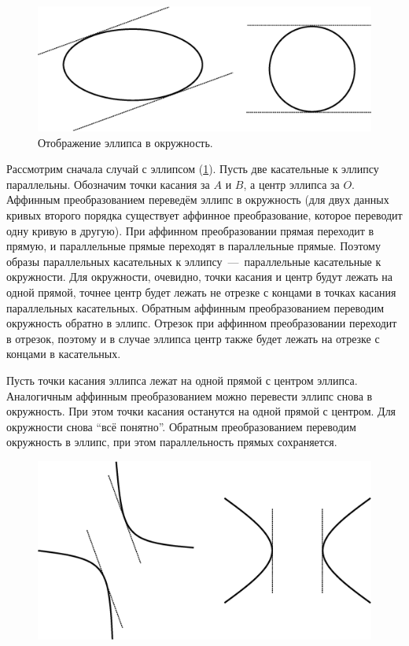 \documentclass[a4paper,12pt]{article}
\begin{document}
  \begin{solution}
    \begin{figure}
      \centering
      
      \includegraphics[width=0.5\columnwidth]{ellipse-new-ellipse}
      
      \caption{Отображение эллипса в окружность.}
      \label{fig:ellipse-new-ellipse}
    \end{figure}
    
    Рассмотрим сначала случай с эллипсом (\ref{fig:ellipse-new-ellipse}).
    Пусть две касательные к эллипсу параллельны.
    Обозначим точки касания за $A$ и $B$, а центр эллипса за $O$.
    Аффинным преобразованием переведём эллипс в окружность (для двух данных кривых второго порядка существует аффинное преобразование, которое переводит одну кривую в другую).
    При аффинном преобразовании прямая переходит в прямую, и параллельные прямые переходят в параллельные прямые.
    Поэтому образы параллельных касательных к эллипсу~---~параллельные касательные к окружности.
    Для окружности, очевидно, точки касания и центр будут лежать на одной прямой, точнее центр будет лежать не отрезке с концами в точках касания параллельных касательных.
    Обратным аффинным преобразованием переводим окружность обратно в эллипс.
    Отрезок при аффинном преобразовании переходит в отрезок, поэтому и в случае эллипса центр также будет лежать на отрезке с концами в касательных.
    
    Пусть точки касания эллипса лежат на одной прямой с центром эллипса.
    Аналогичным аффинным преобразованием можно перевести эллипс снова в окружность.
    При этом точки касания останутся на одной прямой с центром.
    Для окружности снова ``всё понятно''.
    Обратным преобразованием переводим окружность в эллипс, при этом параллельность прямых сохраняется.
    
    \bigskip

    \begin{figure}
      \centering
      
      \includegraphics[width=0.5\columnwidth]{hyperbola-new-hyperbola}  %
      

\end{figure}
\end{solution}
\end{document}
